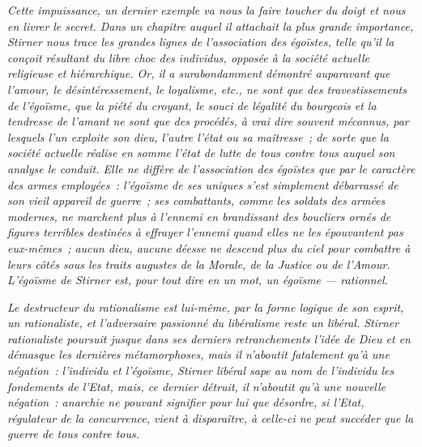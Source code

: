 \documentclass[french,twoside]{book} %
\begin{document}
\emph{Cette impuissance, un dernier exemple va nous la faire toucher du doigt et nous en livrer le secret. Dans un chapitre auquel il attachait la plus grande importance, Stirner nous trace les grandes lignes de l’association des égoïstes, telle qu’il la conçoit résultant du libre choc des individus, opposée à la société actuelle religieuse et hiérarchique. Or, il a surabondamment démontré auparavant que l’amour, le désintéressement, le loyalisme, etc., ne sont que des travestissements de l’égoïsme, que la piété du croyant, le souci de légalité du bourgeois et la tendresse de l’amant ne sont que des procédés, à vrai dire souvent méconnus, par lesquels l’un exploite son dieu, l’autre l’état ou sa maîtresse ; de sorte que la société actuelle réalise en somme l’état de lutte de tous contre tous auquel son analyse le conduit. Elle ne diffère de l’association des égoïstes que par le caractère des armes employées : l’égoïsme de ses uniques s’est simplement débarrassé de son vieil appareil de guerre ; ses combattants, comme les soldats des armées modernes, ne marchent plus à l’ennemi en brandissant des boucliers ornés de figures terribles destinées à effrayer l’ennemi quand elles ne les épouvantent pas eux-mêmes ; aucun dieu, aucune déesse ne descend plus du ciel pour combattre à leurs côtés sous les traits augustes de la Morale, de la Justice ou de l’Amour. L’égoïsme de Stirner est, pour tout dire en un mot, un égoïsme — rationnel.}\par
\emph{Le destructeur du rationalisme est lui-même, par la forme logique de son esprit, un rationaliste, et l’adversaire passionné du libéralisme reste un libéral. Stirner rationaliste poursuit jusque dans ses derniers retranchements  l’idée de Dieu et en démasque les dernières métamorphoses, mais il n’aboutit fatalement qu’à une négation : l’individu et l’égoïsme, Stirner \emph{libéral} sape au nom de l’individu les fondements de l’Etat, mais, ce dernier détruit, il n’aboutit qu’à une nouvelle négation : anarchie ne pouvant signifier pour lui que désordre, si l’Etat, régulateur de la concurrence, vient à disparaître, à celle-ci ne peut succéder que la guerre de tous contre tous.}\par
\end{document}
